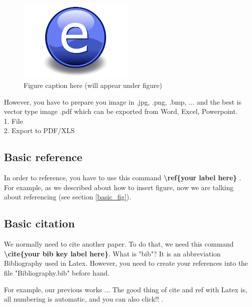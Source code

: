 \begin{figure}[htbp]
	\centering
		\includegraphics[width=0.5\textwidth]{Figures/SampleFigure.pdf}
	\caption[Figure title here (will appear in the list)]{Figure caption here (will appear under figure)}
	\label{fig:SampleFigure}
\end{figure}

However, you have to prepare you image in .jpg, .png, .bmp, ... and the best is vector type image .pdf which can be exported from Word, Excel, Powerpoint.\\
1. File\\
2. Export to PDF/XLS\\



\subsection{Basic reference}
\label{basic_ref}
In order to reference, you have to use this command \textbf{\textbackslash ref\{your label here\} }. For example, as we described about how to insert figure, now we are talking about referencing (see section \ref{basic_fig}).



\subsection{Basic citation}
\label{basic_cite}
We normally need to cite another paper. To do that, we need this command \textbf{\textbackslash cite\{your bib key label here\}}. What is "bib"? It is an abbreviation Bibliography used in Latex. However, you need to create your references into the file "Bibliography.bib" before hand.

For example, our previous works \cite{BibKeyLabel1,BibKeyLabel2}... The good thing of cite and ref with Latex is, all numbering is automatic, and you can also click!! \cite{BibKeyLabel3}.

